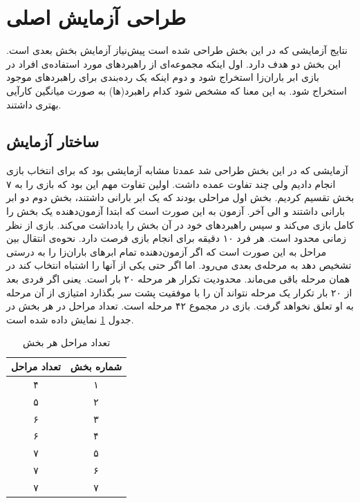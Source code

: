\documentclass[twoside, a4paper,11pt]{book}
\numberwithin{equation}{chapter}
\numberwithin{table}{chapter}
\numberwithin{figure}{chapter}
\numberwithin{equation}{chapter}
\begin{document}
\section{طراحی آزمایش اصلی}
نتایج آزمایشی که در این بخش طراحی شده است پیش‌نیاز آزمایش بخش بعدی است. این بخش دو هدف دارد. اول اینکه مجموعه‌ای از راهبرد‌های مورد استفاده‌ی افراد در بازی ابر باران‌زا استخراج شود و دوم اینکه یک رده‌بندی برای راهبرد‌های موجود استخراج شود. به این معنا که مشخص شود کدام راهبرد‌(ها) به صورت میانگین کارآیی بهتری داشتند.

\subsection{ساختار آزمایش}
آزمایشی که در این بخش طراحی شد عمدتا مشابه آزمایشی بود که برای انتخاب بازی انجام دادیم ولی چند تفاوت عمده داشت. اولین تفاوت مهم این بود که بازی را به ۷ بخش تقسیم کردیم. بخش اول مراحلی بودند که یک ابر بارانی داشتند، بخش دوم دو ابر بارانی داشتند و الی آخر. آزمون به این صورت است که ابتدا آزمون‌دهنده یک بخش را کامل بازی می‌کند و سپس راهبرد‌های خود در آن بخش را یادداشت می‌کند. بازی از نظر زمانی محدود است. هر فرد ۱۰ دقیقه برای انجام بازی فرصت دارد. نحوه‌ی انتقال بین مراحل به این صورت است که اگر آزمون‌دهنده تمام ابرهای باران‌زا را به درستی تشخیص دهد به مرحله‌ی بعدی می‌رود. اما اگر حتی یکی از آنها را اشتباه انتخاب کند در همان مرحله باقی می‌ماند. محدودیت تکرار هر مرحله ۲۰ بار است. یعنی اگر فردی بعد از ۲۰ بار تکرار یک مرحله نتواند آن را با موفقیت پشت سر بگذارد امتیازی از آن مرحله به او تعلق نخواهد گرفت. بازی در مجموع ۴۲ مرحله است. تعداد مراحل در هر بخش در جدول \ref{numOfLevelTable} نمایش داده شده است.

\begin{table}[]
\centering
\caption{تعداد مراحل هر بخش}
\label{numOfLevelTable}
\begin{tabular}{|c|c|}
\hline
\textbf{تعداد مراحل} & \textbf{شماره بخش} \\ \hline
۴                    & ۱                  \\ \hline
۵                    & ۲                  \\ \hline
۶                    & ۳                  \\ \hline
۶                    & ۴                  \\ \hline
۷                    & ۵                  \\ \hline
۷                    & ۶                  \\ \hline
۷                    & ۷                  \\ \hline
\end{tabular}
\end{table}
\end{document}
